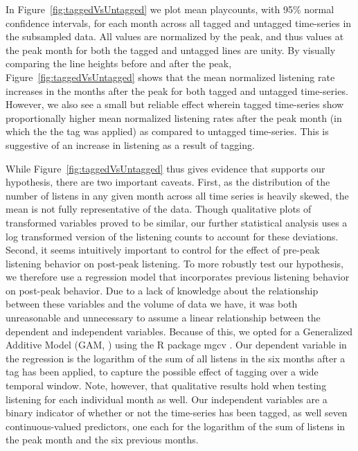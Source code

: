 In Figure~\ref{fig:taggedVsUntagged} we plot mean playcounts, with 95\% normal confidence intervals, for each month across all tagged and untagged time-series in the subsampled data. All values are normalized by the peak, and thus values at the peak month for both the tagged and untagged lines are unity. By visually comparing the line heights before and after the peak, Figure~\ref{fig:taggedVsUntagged} shows that the mean normalized listening rate increases in the months after the peak for both tagged and untagged time-series. However, we also see a small but reliable effect wherein tagged time-series show proportionally higher mean normalized listening rates after the peak month (in which the the tag was applied) as compared to untagged time-series. This is suggestive of an increase in listening as a result of tagging. 

While Figure~\ref{fig:taggedVsUntagged} thus gives evidence that supports our hypothesis, there are two important caveats. First, as the distribution of the number of listens in any given month across all time series is heavily skewed, the mean is not fully representative of the data. Though qualitative plots of transformed variables proved to be similar, our further statistical analysis uses a log transformed version of the listening counts to account for these deviations. Second, it seems intuitively important to control for the effect of pre-peak listening behavior on post-peak listening. To more robustly test our hypothesis, we therefore use a regression model that incorporates previous listening behavior on post-peak behavior. Due to a lack of knowledge about the relationship between these variables and the volume of data we have, it was both unreasonable and unnecessary to assume a linear relationship between the dependent and independent variables. Because of this, we opted for a Generalized Additive Model (GAM, \cite{hastie1990generalized}) using the R package mgcv \cite{wood2001mgcv}. Our dependent variable in the regression is the logarithm of the sum of all listens in the six months after a tag has been applied, to capture the possible effect of tagging over a wide temporal window. Note, however, that qualitative results hold when testing listening for each individual month as well.
Our independent variables are a binary indicator of whether or not the time-series has been tagged, as well seven continuous-valued predictors, one each for the logarithm of the sum of listens in the peak month and the six previous months.   

